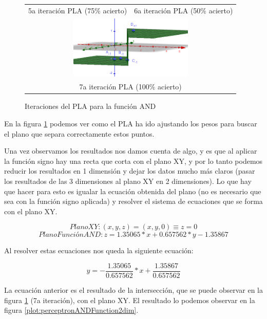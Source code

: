 \begin{figure}[H]
\begin{tabular}{cc}
    5a iteración PLA (75\% acierto) & 6a iteración PLA (50\% acierto) \\[5pt]
    \multicolumn{2}{c}{\includegraphics[width=59mm]{Figures/PerceptronPLA7thiteration}}\\
    \multicolumn{2}{c}{7a iteración PLA (100\% acierto)}
    \end{tabular}
\caption{Iteraciones del PLA para la función AND}
\label{fig:andFunctionPLAIterations}
\end{figure}

\newpage

En la figura \ref{fig:andFunctionPLAIterations} podemos ver como el PLA ha ido ajustando los pesos para buscar el plano que separa correctamente estos puntos.

Una vez observamos los resultados nos damos cuenta de algo, y es que al aplicar la función signo hay una recta que corta con el plano XY, y por lo tanto podemos reducir los resultados en 1 dimensión y dejar los datos mucho más claros (pasar los resultados de las 3 dimensiones al plano XY en 2 dimensiones). Lo que hay que hacer para esto es igualar la ecuación obtenida del plano (no es necesario que sea con la función signo aplicada) y resolver el sistema de ecuaciones que se forma con el plano XY.

\[PlanoXY: (x,y,z)=(x,y,0)\equiv z=0\]
\[PlanoFunciónAND:z=1.35065*x+0.657562*y-1.35867\]

Al resolver estas ecuaciones nos queda la siguiente ecuación:

\[y=-\dfrac{1.35065}{0.657562}*x+\dfrac{1.35867}{0.657562}\]

La ecuación anterior es el resultado de la intersección, que se puede observar en la figura \ref{fig:andFunctionPLAIterations} (7a iteración), con el plano XY. El resultado lo podemos observar en la figura \ref{plot:perceptronANDFunction2dim}.

